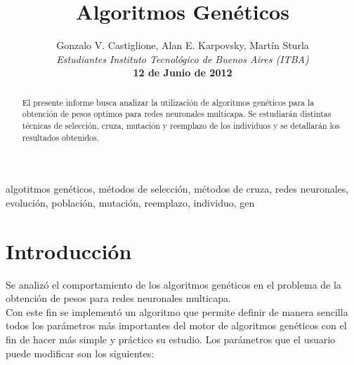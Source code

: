 \documentclass[%
    final,
    reprint,
    notitlepage,
    narroweqnarray,
    inline,
    twoside,
    invited
    ]{ieee}
\begin{document}
\title[Algoritmos Genéticos]{%
       Algoritmos Genéticos}

\author[Castiglione, Karpovsky, Sturla]{Gonzalo V. Castiglione, Alan E. Karpovsky, Martín Sturla\\\textit{Estudiantes 
       Instituto Tecnológico de Buenos Aires (ITBA)}\\
\textbf{12 de Junio de 2012}
}


\lognumber{}
\pubitemident{}


\maketitle               

\begin{abstract} 
El presente informe busca analizar la utilización de algoritmos genéticos para la obtención de pesos optimos para
redes neuronales multicapa. Se estudiarán distintas técnicas de selección, cruza, mutación y reemplazo de los 
individuos y se detallarán los resultados obtenidos.
\end{abstract}

\begin{keywords}
algotitmos genéticos, métodos de selección, métodos de cruza, redes neuronales, evolución, población, mutación, reemplazo, individuo, gen
\end{keywords}

\section{Introducción}

\par Se analizó el comportamiento de los algoritmos genéticos en el problema de la obtención de pesos para redes neuronales multicapa.\\
Con este fin se implementó un algoritmo que permite definir de manera sencilla todos los parámetros más importantes del motor de algoritmos genéticos con el fin de hacer más simple y práctico su estudio. Los parámetros que el usuario puede modificar son los siguientes:\\
\end{document}
